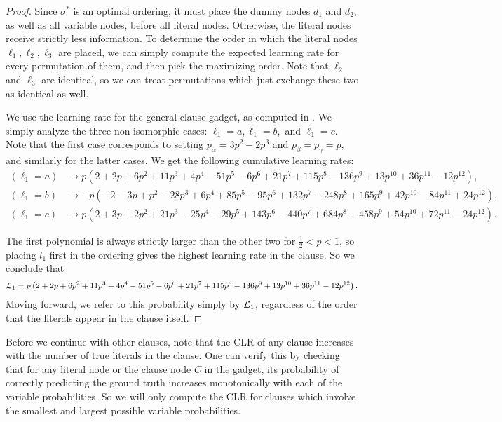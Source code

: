 \begin{proof}
    Since $\sigma^*$ is an optimal ordering, it must place the dummy nodes $d_1$ and $d_2$, as well as all variable nodes, before all literal nodes. Otherwise, the literal nodes receive strictly less information.
    To determine the order in which the literal nodes $\ell_1, \ell_2, \ell_3$ are placed, we can simply compute the expected learning rate for every permutation of them, and then pick the maximizing order.
    Note that $\ell_2$ and $\ell_3$ are identical, so we can treat permutations which just exchange these two as identical as well.

    We use the learning rate for the general clause gadget, as computed in .
    We simply analyze the three non-isomorphic cases: $\ell_1=a, \ell_1=b,$ and $\ell_1=c$. Note that the first case corresponds to setting $p_\alpha = 3p^2 - 2p^3$ and $p_\beta = p_\gamma = p$, and similarly for the latter cases. We get the following cumulative learning rates: \begin{align*}
        (\ell_1=a) &\to p \left(2 + 2 p + 6 p^2 + 11 p^3 + 4 p^4 - 51 p^5 - 6 p^6 + 21 p^7 + 115 p^8 - 136 p^9 + 13 p^{10} + 36 p^{11} - 12 p^{12} \right),\\
        (\ell_1=b) &\to -p \left(-2 - 3 p + p^2 - 28 p^3 + 6 p^4 + 85 p^5 - 95 p^6 + 132 p^7 - 248 p^8 + 165 p^9 + 42 p^{10} - 84 p^{11} + 24 p^{12}\right),\\
        (\ell_1=c) &\to p \left(2 + 3 p + 2 p^2 + 21 p^3 - 25 p^4 - 29 p^5 + 143 p^6 - 440 p^7 + 684 p^8 - 458 p^9 + 54 p^{10} + 72 p^{11} - 24 p^{12}\right).
    \end{align*}
    
    The first polynomial is always strictly larger than the other two for $\frac 12 < p < 1$, so placing $l_1$ first in the ordering gives the highest learning rate in the clause. So we conclude that 
    \begin{align*}
        \mathcal{L}_1 = p \left(2 + 2 p + 6 p^2 + 11 p^3 + 4 p^4 - 51 p^5 - 6 p^6 + 21 p^7 + 
   115 p^8 - 136 p^9 + 13 p^{10} + 36 p^{11} - 12 p^{12} \right).
    \end{align*}
    Moving forward, we refer to this probability simply by $\mathcal{L}_1$, regardless of the order that the literals appear in the clause itself.
\end{proof}

Before we continue with other clauses, note that the CLR of any clause increases with the number of true literals in the clause. One can verify this by checking that for any literal node or the clause node $C$ in the gadget, its probability of correctly predicting the ground truth increases monotonically with each of the variable probabilities. So we will only compute the CLR for clauses which involve the smallest and largest possible variable probabilities.

